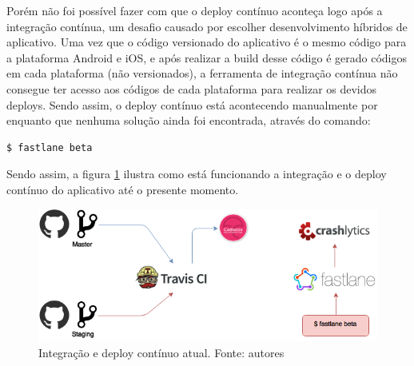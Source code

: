 Porém não foi possível fazer com que o deploy contínuo aconteça logo após a integração contínua, um desafio causado por escolher desenvolvimento híbridos de aplicativo.
Uma vez que o código versionado do aplicativo é o mesmo código para a plataforma Android e iOS, e após realizar a build desse código é gerado códigos em cada plataforma (não versionados),
a ferramenta de integração contínua não consegue ter acesso aos códigos de cada plataforma para realizar os devidos deploys. Sendo assim, o deploy contínuo está acontecendo manualmente
por enquanto que nenhuma solução ainda foi encontrada, através do comando:

\begin{lstlisting}[language=bash]
  $ fastlane beta
\end{lstlisting}

Sendo assim, a figura \ref{img:integracao_deploy_continuo_atual} ilustra como está funcionando a integração e o deploy contínuo do aplicativo até o presente momento.

\begin{figure}[H]
    \centering
    \includegraphics[scale=0.5]{figuras/ci_currently.png}
    \caption[Integração e deploy contínuo atual]{Integração e deploy contínuo atual. Fonte: autores}
    \label{img:integracao_deploy_continuo_atual}
\end{figure}
